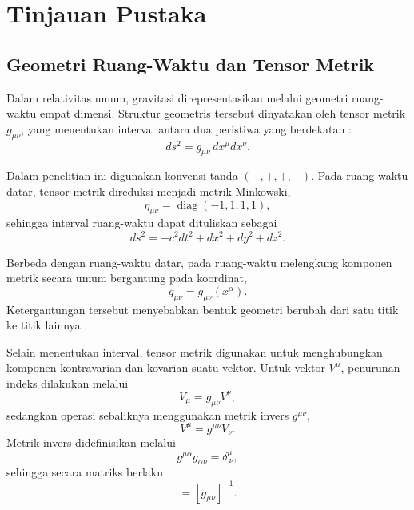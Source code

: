 
\chapter{Tinjauan Pustaka}
\label{chap:tinjauan}

\section{Geometri Ruang-Waktu dan Tensor Metrik}
\label{sec:geometri-metrik}

Dalam relativitas umum, gravitasi direpresentasikan melalui geometri
ruang-waktu empat dimensi. Struktur geometris tersebut dinyatakan oleh
tensor metrik $g_{\mu\nu}$, yang menentukan interval antara dua peristiwa
yang berdekatan \parencite{Schutz2009FirstCourse,Carroll2004SpacetimeGeometry}:
\begin{equation}
    ds^2 = g_{\mu\nu}\,dx^\mu dx^\nu.
    \label{eq:interval-umum}
\end{equation}

Dalam penelitian ini digunakan konvensi tanda $(-,+,+,+)$. Pada
ruang-waktu datar, tensor metrik direduksi menjadi metrik Minkowski,
\begin{equation}
    \eta_{\mu\nu}
    =
    \operatorname{diag}(-1,1,1,1),
    \label{eq:minkowski-metric}
\end{equation}
sehingga interval ruang-waktu dapat dituliskan sebagai
\begin{equation}
    ds^2
    =
    -c^2dt^2
    +dx^2+dy^2+dz^2.
    \label{eq:minkowski-interval}
\end{equation}

Berbeda dengan ruang-waktu datar, pada ruang-waktu melengkung komponen
metrik secara umum bergantung pada koordinat,
\begin{equation}
    g_{\mu\nu}=g_{\mu\nu}(x^\alpha).
\end{equation}
Ketergantungan tersebut menyebabkan bentuk geometri berubah dari satu
titik ke titik lainnya.

Selain menentukan interval, tensor metrik digunakan untuk menghubungkan
komponen kontravarian dan kovarian suatu vektor. Untuk vektor
$V^\mu$, penurunan indeks dilakukan melalui
\begin{equation}
    V_\mu = g_{\mu\nu}V^\nu,
    \label{eq:lowering-index}
\end{equation}
sedangkan operasi sebaliknya menggunakan metrik invers $g^{\mu\nu}$,
\begin{equation}
    V^\mu = g^{\mu\nu}V_\nu.
    \label{eq:raising-index}
\end{equation}
Metrik invers didefinisikan melalui
\begin{equation}
    g^{\mu\alpha}g_{\alpha\nu}
    =
    \delta^\mu_{\ \nu},
    \label{eq:inverse-metric-def}
\end{equation}
sehingga secara matriks berlaku
\begin{equation}
    [g^{\mu\nu}]
    =
    [g_{\mu\nu}]^{-1}.
\end{equation}

